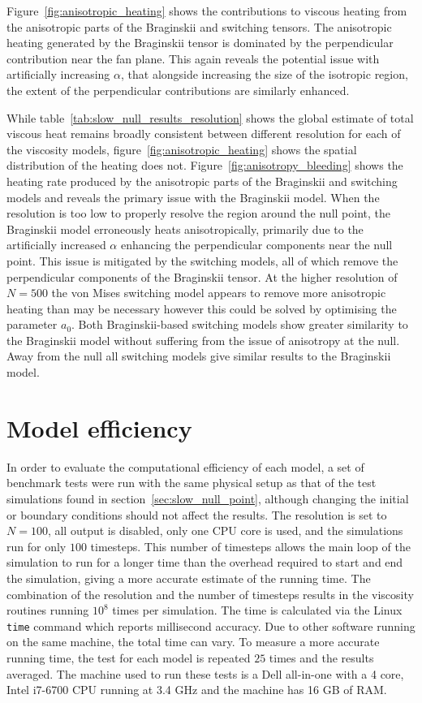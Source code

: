 Figure~\ref{fig:anisotropic_heating} shows the contributions to viscous heating from the anisotropic parts of the Braginskii and switching tensors. The anisotropic heating generated by the Braginskii tensor is dominated by the perpendicular contribution near the fan plane. This again reveals the potential issue with artificially increasing $\alpha$, that alongside increasing the size of the isotropic region, the extent of the perpendicular contributions are similarly enhanced.

While table~\ref{tab:slow_null_results_resolution} shows the global estimate of total viscous heat remains broadly consistent between different resolution for each of the viscosity models, figure~\ref{fig:anisotropic_heating} shows the spatial distribution of the heating does not. Figure~\ref{fig:anisotropy_bleeding} shows the heating rate produced by the anisotropic parts of the Braginskii and switching models and reveals the primary issue with the Braginskii model. When the resolution is too low to properly resolve the region around the null point, the Braginskii model erroneously heats anisotropically, primarily due to the artificially increased $\alpha$ enhancing the perpendicular components near the null point. This issue is mitigated by the switching models, all of which remove the perpendicular components of the Braginskii tensor. At the higher resolution of $N=500$ the von Mises switching model appears to remove more anisotropic heating than may be necessary however this could be solved by optimising the parameter $a_0$. Both Braginskii-based switching models show greater similarity to the Braginskii model without suffering from the issue of anisotropy at the null. Away from the null all switching models give similar results to the Braginskii model.

\section{Model efficiency}

In order to evaluate the computational efficiency of each model, a set of benchmark tests were run with the same physical setup as that of the test simulations found in section~\ref{sec:slow_null_point}, although changing the initial or boundary conditions should not affect the results. The resolution is set to $N=100$, all output is disabled, only one CPU core is used, and the simulations run for only $100$ timesteps. This number of timesteps allows the main loop of the simulation to run for a longer time than the overhead required to start and end the simulation, giving a more accurate estimate of the running time. The combination of the resolution and the number of timesteps results in the viscosity routines running $10^{8}$ times per simulation. The time is calculated via the Linux \verb|time| command which reports millisecond accuracy. Due to other software running on the same machine, the total time can vary. To measure a more accurate running time, the test for each model is repeated $25$ times and the results averaged. The machine used to run these tests is a Dell all-in-one with a 4 core, Intel i7-6700 CPU running at 3.4 GHz and the machine has 16 GB of RAM. 

